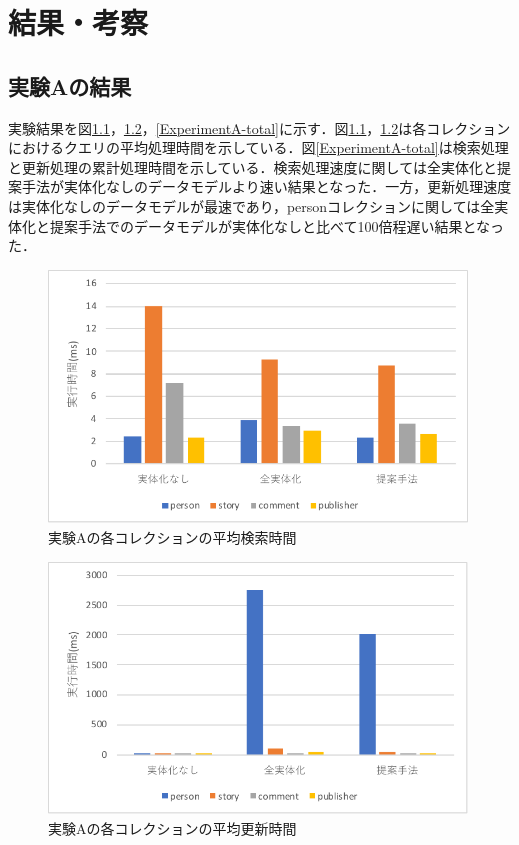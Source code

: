 \documentclass[a4paper,11pt]{ujreport}
\begin{document}
\chapter{結果・考察}
\label{chap:Result}
\section{実験Aの結果}
実験結果を図\ref{ExperimentA-find}，\ref{ExperimentA-update}，\ref{ExperimentA-total}に示す．図\ref{ExperimentA-find}，\ref{ExperimentA-update}は各コレクションにおけるクエリの平均処理時間を示している．図\ref{ExperimentA-total}は検索処理と更新処理の累計処理時間を示している．検索処理速度に関しては全実体化と提案手法が実体化なしのデータモデルより速い結果となった．一方，更新処理速度は実体化なしのデータモデルが最速であり，personコレクションに関しては全実体化と提案手法でのデータモデルが実体化なしと比べて100倍程遅い結果となった．
\begin{figure}[htbp]
	\begin{center}
		\includegraphics[width=30em]{src/ExperimentA-find.pdf} %
	\end{center}
	\caption{実験Aの各コレクションの平均検索時間}
	\label{ExperimentA-find}
\end{figure}
\begin{figure}[htbp]
	\begin{center}
		\includegraphics[width=30em]{src/ExperimentA-update.pdf} %
	\end{center}
	\caption{実験Aの各コレクションの平均更新時間}
	\label{ExperimentA-update}
\end{figure}
\end{document}
